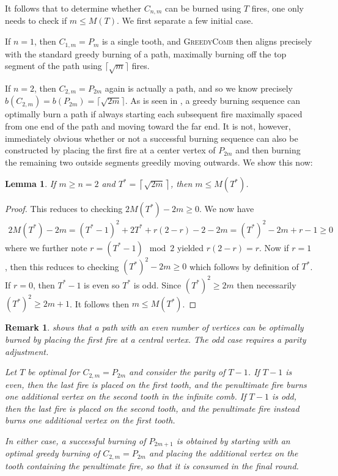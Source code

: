\documentclass{article}
\newtheorem{lemma}{Lemma}
\newtheorem{remark}{Remark}
\begin{document}
It follows that to determine whether $C_{n,m}$ can be burned using $T$ fires, one only needs to check if $m \le M(T)$. We first separate a few initial case. 

If $n = 1$, then $C_{1,m} = P_m$ is a single tooth, and \textsc{GreedyComb} then aligns precisely with the standard greedy burning of a path, maximally burning off the top segment of the path using $\lceil \sqrt m\rceil$ fires. 

If $n = 2$, then $C_{2,m} = P_{2m}$ again is actually a path, and so we know  precisely $b(C_{2,m}) = b(P_{2m}) = \lceil \sqrt{2m}\rceil$. As is seen in , a greedy burning sequence can optimally burn a path if always starting each subsequent fire maximally spaced from one end of the path and moving toward the far end. It is not, however, immediately obvious whether or not a successful burning sequence can also be constructed by placing the first fire at a center vertex of $P_{2m}$ and then burning the remaining two outside segments greedily moving outwards. We show this now: 

\begin{lemma}\label{l: n=2}
    If $m \ge n = 2$ and $T^* = \left\lceil \sqrt{2m}\right\rceil$, then $m \le M(T^*)$.
\end{lemma}
\begin{proof}
    This reduces to checking $2M(T^*) - 2m \ge 0$. We now have
    \begin{align*}
        2M(T^*) - 2m = (T^*-1)^2 + 2T^* + r(2-r) -2 -2m= (T^*)^2 -2m + r - 1 \ge 0
    \end{align*}
    where we further note $r = (T^*-1)\mod 2$  yielded $r(2-r) = r$. Now if $r = 1$, then this reduces to checking $(T^*)^2 - 2m \ge 0$ which follows by definition of $T^*$. If $r = 0$, then $T^*-1$ is even so $T^*$ is odd. Since $(T^*)^2 \ge 2m$ then necessarily $(T^*)^2 \ge 2m + 1$. It follows then $m \le M(T^*)$.
\end{proof}

\begin{remark}
     shows that a path with an even number of vertices can be optimally burned by placing the first fire at a central vertex. The odd case requires a parity adjustment.

    Let $T$ be optimal for $C_{2,m}=P_{2m}$ and consider the parity of $T-1$. If $T-1$ is even, then the last fire is placed on the first tooth, and the penultimate fire burns one additional vertex on the second tooth in the infinite comb. If $T-1$ is odd, then the last fire is placed on the second tooth, and the penultimate fire instead burns one additional vertex on the first tooth.
    
    In either case, a successful burning of $P_{2m+1}$ is obtained by starting with an optimal greedy burning of $C_{2,m}=P_{2m}$ and placing the additional vertex on the tooth containing the penultimate fire, so that it is consumed in the final round.
\end{remark}
\end{document}
